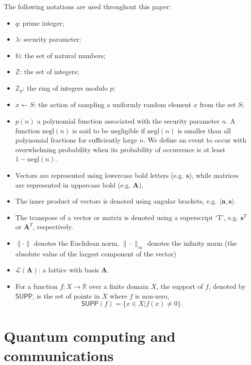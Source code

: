\documentclass[cryptography,review,submit,pdftex,moreauthors,amsmath,amssymb,aps,strict]{Definitions/mdpi}
\newcommand{\peter}[1]{\textcolor{red}{#1}}
\begin{document}
The following notations are used throughout this paper:
\begin{itemize}
    \item $q$: prime integer;
    \item $\lambda$: security parameter;
    \item $\mathbb{N}$: the set of natural numbers;
    \item $\mathbb{Z}$: the set of integers;
    \item $\mathbb{Z}_p$: the ring of integers modulo $p$;
    \item $x\gets S$: the action of sampling a uniformly random element $x$ from the set $S$;
    \item $p(n)$ a polynomial function associated with the security parameter $n$. A function $\mathrm{negl}(n)$ is said to be negligible if $\mathrm{negl}(n)$ is smaller than all polynomial fractions for sufficiently large $n$. We define an event to occur with overwhelming probability when its probability of occurrence is at least $1-\mathrm{negl}(n)$. 
    \item Vectors are represented using lowercase bold letters (e.g. $\mathbf{s}$), while matrices are represented in uppercase bold (e.g. $\mathbf{A}$). 
    \item The inner product of vectors is denoted using angular brackets, e.g. $\langle\mathbf{a},\mathbf{s}\rangle$.
    \item The transpose of a vector or matrix is denoted using a superscript `T', e.g. $\mathbf{s}^T$ or $\mathbf{A}^T$, respectively.
    \item $\|\cdot\|$ denotes the Euclidean norm, $\|\cdot\|_{\infty}$ denotes the infinity norm (the absolute value of the largest component of the vector)
    \item $\mathcal{L}(\mathbf{A})$: a lattice with basis $\mathbf{A}$.
    \item For a function $f:X\to \mathbb{R}$ over a finite domain $X$, the support of $f$, denoted by $\mathsf{SUPP}$, is the set of points in $X$ where $f$ is non-zero,
    $$\mathsf{SUPP}(f)=\{x\in X|f(x)\neq 0\}.$$
\end{itemize}
\section{Quantum computing and communications} \label{quantum_computing}
\end{document}
